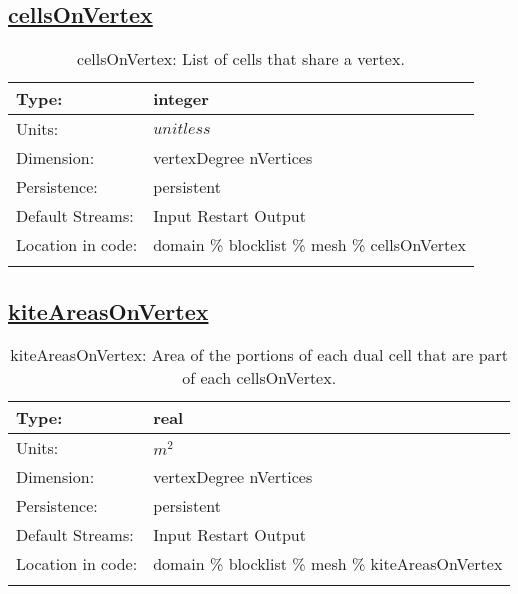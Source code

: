 \subsection[cellsOnVertex]{\hyperref[sec:var_tab_mesh]{cellsOnVertex}}
\label{subsec:var_sec_mesh_cellsOnVertex}
\begin{center}
\begin{longtable}{| p{2.0in} | p{4.0in} |}
        \hline 
        Type: & integer \\
        \hline 
        Units: & $unitless$ \\
        \hline 
        Dimension: & vertexDegree nVertices \\
        \hline 
        Persistence: & persistent \\
        \hline 
		 Default Streams: & Input Restart Output  \\
        \hline 
		 Location in code: & domain \% blocklist \% mesh \% cellsOnVertex \\
		 \hline 
    \caption{cellsOnVertex: List of cells that share a vertex.}
\end{longtable}
\end{center}
\subsection[kiteAreasOnVertex]{\hyperref[sec:var_tab_mesh]{kiteAreasOnVertex}}
\label{subsec:var_sec_mesh_kiteAreasOnVertex}
\begin{center}
\begin{longtable}{| p{2.0in} | p{4.0in} |}
        \hline 
        Type: & real \\
        \hline 
        Units: & $m^2$ \\
        \hline 
        Dimension: & vertexDegree nVertices \\
        \hline 
        Persistence: & persistent \\
        \hline 
		 Default Streams: & Input Restart Output  \\
        \hline 
		 Location in code: & domain \% blocklist \% mesh \% kiteAreasOnVertex \\
		 \hline 
    \caption{kiteAreasOnVertex: Area of the portions of each dual cell that are part of each cellsOnVertex.}
\end{longtable}
\end{center}

